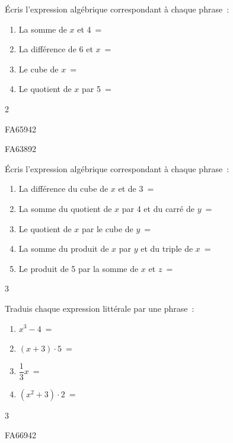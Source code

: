 \documentclass[a4paper,11pt]{report}
\begin{document}
\begin{exop}{ Écris l'expression algébrique correspondant à chaque phrase~:
\begin{enumerate} 
    \item La somme de $x$ et 4~= \hrulefill
     \item  La différence de 6 et $x$~= \hrulefill
     \item  Le cube de $x$~= \hrulefill
    \item  Le quotient de $x$ par 5~= \hrulefill
\end{enumerate}
}
{2}
\end{exop}

\begin{exof}{FA65}{94}{2}
\end{exof}

\begin{exol}{FA63}{89}{2}
\end{exol}

\begin{exop}{ Écris l'expression algébrique correspondant à chaque phrase~:
\begin{enumerate}
    \item La différence du cube de $x$ et de 3~= \hrulefill
    \item La somme du quotient de $x$ par 4 et du carré de $y$~= \hrulefill
     \item  Le quotient de $x$ par le cube de $y$~= \hrulefill
     \item  La somme du produit de $x$ par $y$ et du triple de $x$~= \hrulefill
    \item  Le produit de 5 par la somme de $x$ et $z$~= \hrulefill
\end{enumerate}
}
{3}
\end{exop}

\begin{exop}{ Traduis chaque expression littérale par une phrase~:
\begin{enumerate}
    \item $x^3-4$~= \hrulefill
    \item $(x+3)\cdot5$~= \hrulefill
     \item  $\dfrac{1}{3}x$~= \hrulefill
     \item  $(x^2+3)\cdot2$~= \hrulefill
\end{enumerate}
}
{3}
\end{exop}

\begin{exof}{FA66}{94}{2}
\end{exof}
\end{document}

